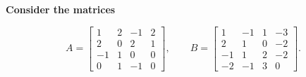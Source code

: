 \providecommand{\rank}{\operatorname{r}}
\providecommand{\RR}{\mathbb R}
\providecommand{\CC}{\mathbb C}
\providecommand{\KK}{\mathbb K}

\setcounter{enumi}{48}
\item {\bfseries\boldmath
Consider the matrices
}

\[
A=\begin{bmatrix}1&2&-1&2\\2&0&2&1\\-1&1&0&0\\0&1&-1&0\end{bmatrix},\qquad B=\begin{bmatrix}1&-1&1&-3\\2&1&0&-2\\-1&1&2&-2\\-2&-1&3&0\end{bmatrix}.
\]

